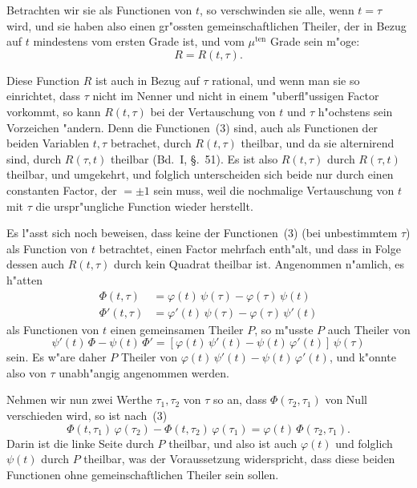 \documentclass[12pt,a4paper]{article}
\theoremstyle{plain}
\begin{document}
Betrachten wir sie als Functionen von $t$, so verschwinden sie alle, wenn $t=\tau$ wird, und sie haben also einen gr"ossten gemeinschaftlichen Theiler, der in Bezug auf $t$ mindestens vom ersten Grade ist, und vom $\mu^{\text{ten}}$ Grade sein m"oge:
\begin{equation}\tag{4}
R = R(t, \tau).
\end{equation}

Diese Function $R$ ist auch in Bezug auf $\tau$ rational, und wenn man sie so einrichtet, dass $\tau$ nicht im Nenner und nicht in einem "uberfl"ussigen Factor vorkommt, so kann $R(t,\tau)$ bei der Vertauschung von $t$ und $\tau$ h"ochstens sein Vorzeichen "andern. Denn die Functionen~(3) sind, auch als Functionen der beiden Variablen $t, \tau$ betrachet, durch $R(t,\tau)$ theilbar, und da sie alternirend sind, durch $R(\tau,t)$ theilbar (Bd.~I, \S.~51). Es ist also $R(t,\tau)$ durch $R(\tau,t)$ theilbar, und umgekehrt, und folglich unterscheiden sich beide nur durch einen constanten Factor, der $=\pm 1$ sein muss, weil die nochmalige Vertauschung von $t$ mit $\tau$ die urspr"ungliche Function wieder herstellt.

Es l"asst sich noch beweisen, dass keine der Functionen~(3) (bei unbestimmtem $\tau$) als Function von $t$ betrachtet, einen Factor mehrfach enth"alt, und dass in Folge dessen auch $R(t,\tau)$ durch kein Quadrat theilbar ist. Angenommen n"amlich, es h"atten
\begin{align*}
\varPhi(t,\tau) &= \varphi(t)\,\psi(\tau) - \varphi(\tau)\,\psi(t)\\
\varPhi'(t,\tau) &= \varphi'(t)\,\psi(\tau) - \varphi(\tau)\,\psi'(t)
\end{align*}
als Functionen von $t$ einen gemeinsamen Theiler $P$, so m"usste $P$ auch Theiler von
\[\psi'(t)\,\varPhi - \psi(t)\,\varPhi' = [\varphi(t)\,\psi'(t) - \psi(t)\,\varphi'(t)]\,\psi(\tau)\]
sein. Es w"are daher $P$ Theiler von $\varphi(t)\,\psi'(t) - \psi(t)\,\varphi'(t)$, und k"onnte also von $\tau$ unabh"angig angenommen werden.

Nehmen wir nun zwei Werthe $\tau_1, \tau_2$ von $\tau$ so an, dass $\varPhi(\tau_2,\tau_1)$ von Null verschieden wird, so ist nach~(3)
\[\varPhi(t,\tau_1)\,\varphi(\tau_2) - \varPhi(t,\tau_2)\,\varphi(\tau_1) = \varphi(t)\,\varPhi(\tau_2,\tau_1).\]
Darin ist die linke Seite durch $P$ theilbar, und also ist auch $\varphi(t)$ und folglich $\psi(t)$ durch $P$ theilbar, was der Voraussetzung widerspricht, dass diese beiden Functionen ohne gemeinschaftlichen Theiler sein sollen.
\end{document}

